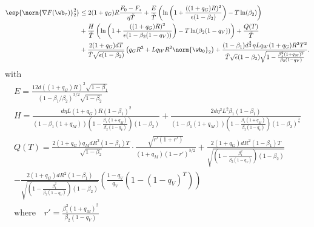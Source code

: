 \documentclass[11pt, letterpaper]{article}
\begin{document}
\begin{align}\label{bound_without_simplify}
\nonumber
    \esp{\norm{\nabla F(\wb_{\tau})}_2^2} &\leq
    2 (1+q_G)R \frac{F_0 - F_*}{\eta \tilde{T}}  + \frac{E}{\tilde{T}}\left(\ln\left(1 + \frac{((1+q_G)R)^2}{\epsilon( 1- \beta_2)}\right) - T \ln(\beta_2)\right)\\
    \nonumber
    &+ \frac{H}{\tilde{T}}\left(\ln\left(1 + \frac{((1+q_G)R)^2}{\epsilon(1-\beta_2(1-q_V))}\right) - T\ln(\beta_2(1-q_V))\right)         +\frac{Q(T)}{\tilde{T}}\\
    &+\frac{2(1+q_G) d T}{\tilde{T}\sqrt{\epsilon(1-\beta_2)}} \left( q_G R^3 + L q_W R^2 \norm{\wb_0}_2 \right) + \frac{(1-\beta_1)d^\frac{3}{2} \eta L q_W(1+q_G)R^2 T^2}{\tilde{T}\sqrt{\epsilon}(1-\beta_2)\sqrt{1-\frac{\beta_1^2(1+q_M)^2}{\beta_2(1-q_V)}}}.
\end{align}
with
\begin{equation}
\begin{gathered}
    E = \frac{12 d ((1+q_G)R)^2 \sqrt{1-\beta_1}}{(1 - \beta_1 / \beta_2)^{3/2}\sqrt{1 - \beta_2}} \\
    H = \frac{d\eta L(1+q_G)R(1-\beta_1)^2}{(1 - \beta_1(1+q_M))(1 - \frac{\beta_1(1+q_M)}{\beta_2(1-q_V)})(1-\beta_2)}+\frac{2d\eta^2 L^2 \beta_1(1-\beta_1)}{(1 - \beta_1(1+q_M))(1 - \frac{\beta_1(1+q_M)}{\beta_2(1-q_V)})(1-\beta_2)^{\frac{3}{2}}} \\
    Q(T) = \frac{2(1+q_G)q_M  dR^2(1-\beta_1)T }{\sqrt{1-\beta_2}}\cdot\frac{\sqrt{r'(1+r')}}{(1+q_M)(1-r')^{3/2}} + \frac{2(1+q_G)dR^2(1-\beta_1)T}{\sqrt{(1-\frac{\beta_1^2}{\beta_2(1-q_V)})(1-\beta_2)}}\\
    -\frac{2(1+q_G)dR^2(1-\beta_1)}{\sqrt{(1-\frac{\beta_1^2}{\beta_2(1-q_V)})(1-\beta_2)}} \left( \frac{1-q_V}{q_V}(1-(1-q_V)^T) \right) \\
    \text{where} \quad r' = \frac{\beta_1^2(1+q_M)^2}{\beta_2(1-q_V)}
\end{gathered}
\end{equation}
\end{document}
